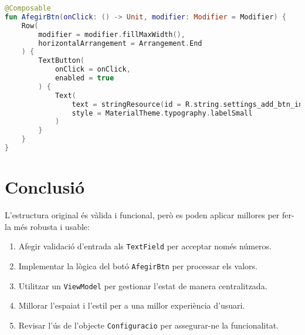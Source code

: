 \documentclass[a4paper,12pt]{article}
\begin{document}
\begin{lstlisting}[language=Kotlin]
@Composable
fun AfegirBtn(onClick: () -> Unit, modifier: Modifier = Modifier) {
    Row(
        modifier = modifier.fillMaxWidth(),
        horizontalArrangement = Arrangement.End
    ) {
        TextButton(
            onClick = onClick,
            enabled = true
        ) {
            Text(
                text = stringResource(id = R.string.settings_add_btn_interval),
                style = MaterialTheme.typography.labelSmall
            )
        }
    }
}
\end{lstlisting}

\section{Conclusió}

L'estructura original és vàlida i funcional, però es poden aplicar millores per fer-la més robusta i usable:
\begin{enumerate}
    \item Afegir validació d'entrada als \texttt{TextField} per acceptar només números.
    \item Implementar la lògica del botó \texttt{AfegirBtn} per processar els valors.
    \item Utilitzar un \texttt{ViewModel} per gestionar l'estat de manera centralitzada.
    \item Millorar l'espaiat i l'estil per a una millor experiència d'usuari.
    \item Revisar l'ús de l'objecte \texttt{Configuracio} per assegurar-ne la funcionalitat.
\end{enumerate}
\end{document}
